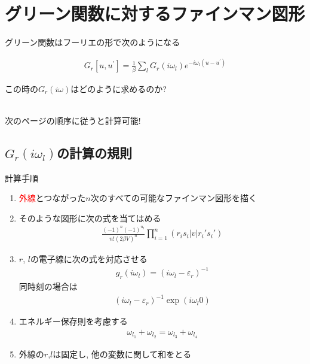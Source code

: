 \documentclass[dvipdfmx,10pt]{beamer}
\begin{document}
\section{グリーン関数に対するファインマン図形}
\begin{frame}
    グリーン関数はフーリエの形で次のようになる
    \begin{block}{}
        \begin{align}
            G_r[u,u^{'}] = \frac{1}{\beta}\sum_lG_r(i\omega_l)e^{-i\omega_l(u-u^{'})}
        \end{align}
    \end{block}
    \centering
    この時の$G_r(i\omega)$はどのように求めるのか?\\
    \\
    次のページの順序に従うと計算可能!
    
\end{frame}

\subsection{$G_r(i\omega_l)$の計算の規則}
\begin{frame}{計算手順}
    \footnotesize
    \begin{enumerate}
        \item \textcolor{red}{外線}とつながった$n$次のすべての可能なファインマン図形を描く
        \item そのような図形に次の式を当てはめる
        \begin{align*}
            \frac{(-1)^n(-1)^{n_l}}{n!(2\beta V)^n}\prod_{i=1}^{n}\left(r_is_i|v|r_i's_i'\right)
        \end{align*}
        \item $r$, $l$の電子線に次の式を対応させる
        \begin{align*}
            g_r(i\omega_l) = (i\omega_l-\varepsilon_r)^{-1}
        \end{align*}
        同時刻の場合は
        \begin{align*}
            (i\omega_l-\varepsilon_r)^{-1}\exp(i\omega_l0)
        \end{align*}
        \item エネルギー保存則を考慮する
        \begin{align*}
            \omega_{l_1} + \omega_{l_2} = \omega_{l_3} + \omega_{l_4}
        \end{align*}
        \item 外線の$r$,$l$は固定し, 他の変数に関して和をとる
    \end{enumerate}
    \normalsize
\end{frame}
\end{document}
